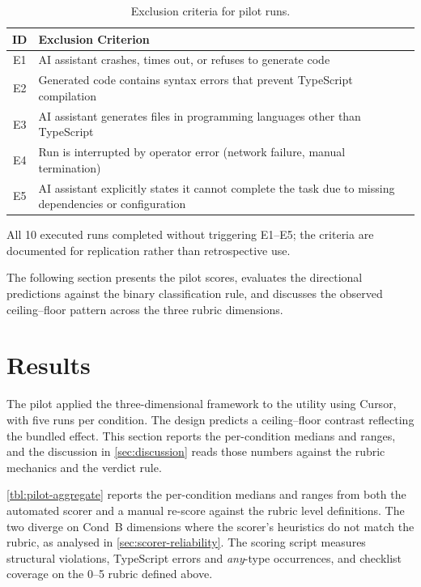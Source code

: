 \documentclass[12pt,a4paper]{report}
\begin{document}
\begin{table}[H]
\centering
\begin{tabular}{cp{10cm}}
\toprule
\textbf{ID} & \textbf{Exclusion Criterion} \\
\midrule
E1 & AI assistant crashes, times out, or refuses to generate code \\
E2 & Generated code contains syntax errors that prevent TypeScript compilation \\
E3 & AI assistant generates files in programming languages other than TypeScript \\
E4 & Run is interrupted by operator error (network failure, manual termination) \\
E5 & AI assistant explicitly states it cannot complete the task due to missing dependencies or configuration \\
\bottomrule
\end{tabular}
\caption{Exclusion criteria for pilot runs.}
\label{tab:exclusion-criteria}
\end{table}

All 10 executed runs completed without triggering E1--E5; the criteria are documented for replication rather than retrospective use.

The following section presents the pilot scores, evaluates the directional predictions against the binary classification rule, and discusses the observed ceiling--floor pattern across the three rubric dimensions.

\section{Results}
\label{sec:pilot-results}

The pilot applied the three-dimensional framework to the  utility using Cursor, with five runs per condition. The design predicts a ceiling--floor contrast reflecting the bundled effect. This section reports the per-condition medians and ranges, and the discussion in \autoref{sec:discussion} reads those numbers against the rubric mechanics and the verdict rule.

\autoref{tbl:pilot-aggregate} reports the per-condition medians and ranges from both the automated scorer and a manual re-score against the rubric level definitions. The two diverge on Cond~B dimensions where the scorer's heuristics do not match the rubric, as analysed in \autoref{sec:scorer-reliability}. The scoring script measures structural violations, TypeScript errors and \emph{any}-type occurrences, and checklist coverage on the 0--5 rubric defined above.
\end{document}
